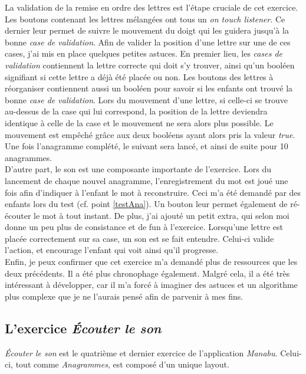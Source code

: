 La validation de la remise en ordre des lettres est l'étape cruciale de cet exercice. Les boutons contenant les lettres mélangées ont tous un \textit{on touch listener}. Ce dernier leur permet de suivre le mouvement du doigt qui les guidera jusqu'à la bonne \textit{case de validation}. Afin de valider la position d'une lettre sur une de ces cases, j'ai mis en place quelques petites astuces. En premier lieu, les \textit{cases de validation} contiennent la lettre correcte qui doit s'y trouver, ainsi qu'un booléen signifiant si cette lettre a déjà été placée ou non. Les boutons des lettres à réorganiser contiennent aussi un booléen pour savoir si les enfants ont trouvé la bonne \textit{case de validation}. Lors du mouvement d'une lettre, si celle-ci se trouve au-dessus de la case qui lui correspond, la position de la lettre deviendra identique à celle de la case et le mouvement ne sera alors plus possible. Le mouvement est empêché grâce aux deux booléens ayant alors pris la valeur \textit{true}. Une fois l'anagramme complété, le suivant sera lancé, et ainsi de suite pour 10 anagrammes.\\

D'autre part, le son est une composante importante de l'exercice. Lors du lancement de chaque nouvel anagramme, l'enregistrement du mot est joué une fois afin d'indiquer à l'enfant le mot à reconstruire. Ceci m'a été demandé par des enfants lors du test (cf. point \ref{testAna}). Un bouton leur permet également de ré-écouter le mot à tout instant. De plus, j'ai ajouté un petit extra, qui selon moi donne un peu plus de consistance et de fun à l'exercice. Lorsqu'une lettre est placée correctement sur sa case, un son est se fait entendre. Celui-ci valide l'action, et encourage l'enfant qui voit ainsi qu'il progresse.\\

Enfin, je peux confirmer que cet exercice m'a demandé plus de ressources que les deux précédents. Il a été plus chronophage également. Malgré cela, il a été très intéressant à développer, car il m'a forcé à imaginer des astuces et un algorithme plus complexe que je ne l'aurais pensé afin de parvenir à mes fins.

\subsection{L'exercice \textit{Écouter le son}}
\textit{Écouter le son} est le quatrième et dernier exercice de l'application \textit{Manabu}. Celui-ci, tout comme \textit{Anagrammes}, est composé d'un unique layout.\\

